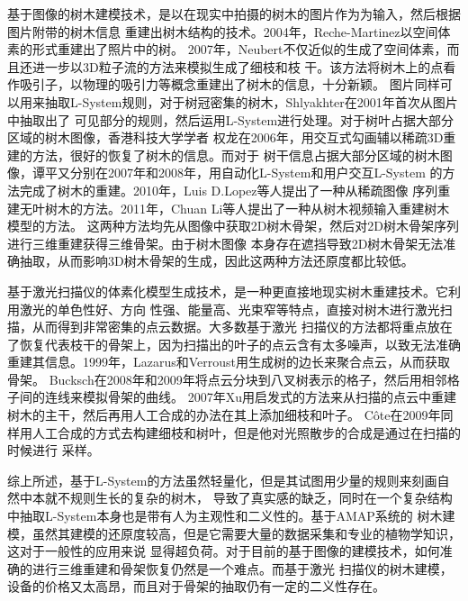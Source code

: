 基于图像的树木建模技术，是以在现实中拍摄的树木的图片作为为输入，然后根据图片附带的树木信息
重建出树木结构的技术。2004年，Reche-Martinez以空间体素的形式重建出了照片中的树\cite{reche}。
2007年，Neubert不仅近似的生成了空间体素，而且还进一步以3D粒子流的方法来模拟生成了细枝和枝
干\cite{neubert}。该方法将树木上的点看作吸引子，以物理的吸引力等概念重建出了树木的信息，十分新颖。
图片同样可以用来抽取L-System规则，对于树冠密集的树木，Shlyakhter在2001年首次从图片中抽取出了
可见部分的规则，然后运用L-System进行处理。对于树叶占据大部分区域的树木图像，香港科技大学学者
权龙在2006年，用交互式勾画辅以稀疏3D重建的方法，很好的恢复了树木的信息\cite{quanlong}。而对于
树干信息占据大部分区域的树木图像，谭平又分别在2007年和2008年，用自动化L-System和用户交互L-System
的方法完成了树木的重建\cite{tanping,tanping2}。2010年，Luis D.Lopez等人提出了一种从稀疏图像
序列重建无叶树木的方法。2011年，Chuan Li等人提出了一种从树木视频输入重建树木模型的方法\cite{lichuan}。
这两种方法均先从图像中获取2D树木骨架，然后对2D树木骨架序列进行三维重建获得三维骨架。由于树木图像
本身存在遮挡导致2D树木骨架无法准确抽取，从而影响3D树木骨架的生成，因此这两种方法还原度都比较低。

基于激光扫描仪的体素化模型生成技术，是一种更直接地现实树木重建技术。它利用激光的单色性好、方向
性强、能量高、光束窄等特点，直接对树木进行激光扫描，从而得到非常密集的点云数据。大多数基于激光
扫描仪的方法都将重点放在了恢复代表枝干的骨架上，因为扫描出的叶子的点云含有太多噪声，以致无法准确
重建其信息。1999年，Lazarus和Verroust用生成树的边长来聚合点云，从而获取骨架\cite{verroust}。
Bucksch在2008年和2009年将点云分块到八叉树表示的格子，然后用相邻格子间的连线来模拟骨架的曲线\cite{bucksch}。
2007年Xu用启发式的方法来从扫描的点云中重建树木的主干，然后再用人工合成的办法在其上添加细枝和叶子\cite{xu}。
C\^ote在2009年同样用人工合成的方式去构建细枝和树叶，但是他对光照散步的合成是通过在扫描的时候进行
采样\cite{cote}。

综上所述，基于L-System的方法虽然轻量化，但是其试图用少量的规则来刻画自然中本就不规则生长的复杂的树木，
导致了真实感的缺乏，同时在一个复杂结构中抽取L-System本身也是带有人为主观性和二义性的。基于AMAP系统的
树木建模，虽然其建模的还原度较高，但是它需要大量的数据采集和专业的植物学知识，这对于一般性的应用来说
显得超负荷。对于目前的基于图像的建模技术，如何准确的进行三维重建和骨架恢复仍然是一个难点。而基于激光
扫描仪的树木建模，设备的价格又太高昂，而且对于骨架的抽取仍有一定的二义性存在。

